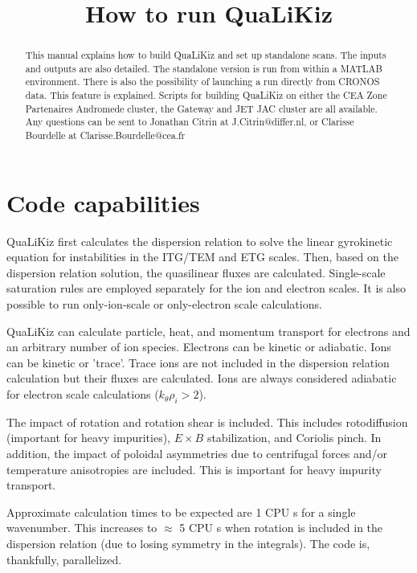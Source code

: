 \documentclass{article}
\begin{document}
\title{How to run QuaLiKiz}

\maketitle

\begin{abstract}
This manual explains how to build QuaLiKiz and set up standalone scans. The inputs and outputs are also detailed. The standalone version is run from within a MATLAB environment. There is also the possibility of launching a run directly from CRONOS data. This feature is explained. Scripts for building QuaLiKiz on either the CEA Zone Partenaires Andromede cluster, the Gateway and JET JAC cluster are all available. Any questions can be sent to Jonathan Citrin at J.Citrin@differ.nl, or Clarisse Bourdelle at Clarisse.Bourdelle@cea.fr
\end{abstract}

\section{Code capabilities}
QuaLiKiz first calculates the dispersion relation to solve the linear gyrokinetic equation for instabilities in the ITG/TEM and ETG scales. Then, based on the dispersion relation solution, the quasilinear fluxes are calculated. Single-scale saturation rules are employed separately for the ion and electron scales. It is also possible to run only-ion-scale or only-electron scale calculations.

QuaLiKiz can calculate particle, heat, and momentum transport for electrons and an arbitrary number of ion species. Electrons can be kinetic or adiabatic. Ions can be kinetic or 'trace'. Trace ions are not included in the dispersion relation calculation but their fluxes are calculated. Ions are always considered adiabatic for electron scale calculations ($k_\theta\rho_i>2$). 

The impact of rotation and rotation shear is included. This includes rotodiffusion (important for heavy impurities), $E{\times}B$ stabilization, and Coriolis pinch. In addition, the impact of poloidal asymmetries due to centrifugal forces and/or temperature anisotropies are included. This is important for heavy impurity transport.

Approximate calculation times to be expected are 1 CPU s for a single wavenumber. This increases to $\approx$ 5 CPU s when rotation is included in the dispersion relation (due to losing symmetry in the integrals). The code is, thankfully, parallelized. 
\end{document}
